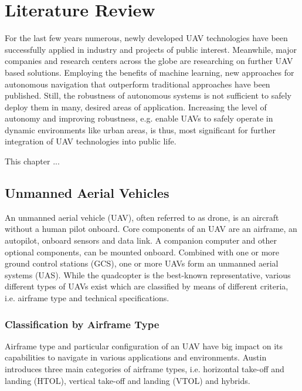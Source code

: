 
\chapter{Literature Review} %

\label{Chapter2} %

For the last few years
numerous, newly developed
UAV technologies have been
successfully applied in 
industry and
projects of public interest.
Meanwhile, 
major companies and
research centers across the globe
are researching on further UAV based solutions.
Employing the benefits of machine learning, 
new approaches for autonomous navigation
that outperform traditional approaches 
have been published.
Still, the robustness
of autonomous systems 
is not sufficient to
safely deploy them in many, desired
areas of application. 
Increasing the level of autonomy and
improving robustness,
e.g. enable UAVs to safely operate in 
dynamic environments like urban areas,
is thus, most significant
for further 
integration of
UAV technologies
into public life.

This chapter ...



\section{Unmanned Aerial Vehicles}
An unmanned aerial vehicle (UAV),
often referred to as drone, is an
aircraft without a human pilot onboard.
Core components of an UAV are an airframe,
an autopilot, onboard sensors and 
data link. A companion computer
and other optional components,
can be mounted onboard.
Combined with one or more
ground control stations (GCS),
one or more UAVs form an
unmanned aerial systems (UAS).
While the quadcopter is the best-known representative,
various different types of UAVs exist
which are classified by means of
different criteria, i.e.
airframe type and technical specifications.
\cite{Fahlstrom2012}

\subsection{Classification by Airframe Type}
Airframe type and particular configuration
of an UAV
have big impact on its
capabilities to navigate in
various applications 
and environments.
\cite{Kong2010}
Austin introduces three main categories
of airframe types, i.e.
horizontal take-off and landing (HTOL),
vertical take-off and landing (VTOL)
and hybrids.
\cite{Austin2011}

